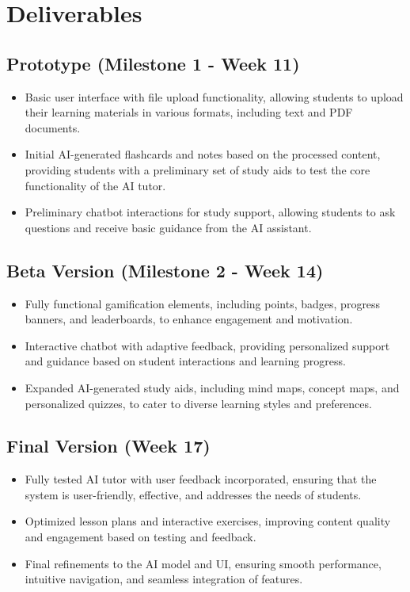 \documentclass[
	letterpaper, %
]{jdf}
\begin{document}
\section{Deliverables}

\subsection{Prototype (Milestone 1 - Week 11)}
\begin{itemize}
    \item Basic user interface with file upload functionality, allowing students to upload their learning materials in various formats, including text and PDF documents.
    \item Initial AI-generated flashcards and notes based on the processed content, providing students with a preliminary set of study aids to test the core functionality of the AI tutor.
    \item Preliminary chatbot interactions for study support, allowing students to ask questions and receive basic guidance from the AI assistant.
\end{itemize}

\subsection{Beta Version (Milestone 2 - Week 14)}
\begin{itemize}
    \item Fully functional gamification elements, including points, badges, progress banners, and leaderboards, to enhance engagement and motivation.
    \item Interactive chatbot with adaptive feedback, providing personalized support and guidance based on student interactions and learning progress.
    \item Expanded AI-generated study aids, including mind maps, concept maps, and personalized quizzes, to cater to diverse learning styles and preferences.
\end{itemize}

\subsection{Final Version (Week 17)}
\begin{itemize}
    \item Fully tested AI tutor with user feedback incorporated, ensuring that the system is user-friendly, effective, and addresses the needs of students.
    \item Optimized lesson plans and interactive exercises, improving content quality and engagement based on testing and feedback.
    \item Final refinements to the AI model and UI, ensuring smooth performance, intuitive navigation, and seamless integration of features.
\end{itemize}
\end{document}
